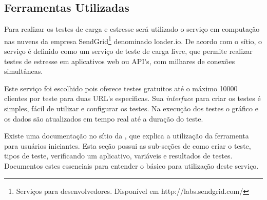





\subsection{Ferramentas Utilizadas}
\label{ferramentas-utilizadas-para-testes}
  
  Para realizar os testes de carga e estresse será utilizado o serviço em computação nas nuvens
  da empresa SendGrid\footnote[8]{Serviços para desenvolvedores. Disponível em http://labs.sendgrid.com/} denominado loader.io.
  De acordo com o sítio, o serviço é definido como um serviço de teste de carga livre,
  que permite realizar testes de estresse em aplicativos web ou API\'{}s, com milhares de conexões simultâneas.
  
  Este serviço foi escolhido pois oferece testes gratuitos até o máximo 10000 clientes por teste para duas 
  URL\'{}s especificas. Sua \textit{interface} para criar os testes é simples, fácil de utilizar e
  configurar os testes. Na execução dos testes o gráfico e os dados são atualizados em tempo real até a duração do teste.
  
  Existe uma documentação no sítio da , que explica a utilização da ferramenta para usuários
  iniciantes. Esta seção possui as sub-seções de como criar o teste, tipos de teste,
  verificando um aplicativo, variáveis e resultados de testes. Documentos estes essenciais para 
  entender o básico para utilização deste serviço. 
  